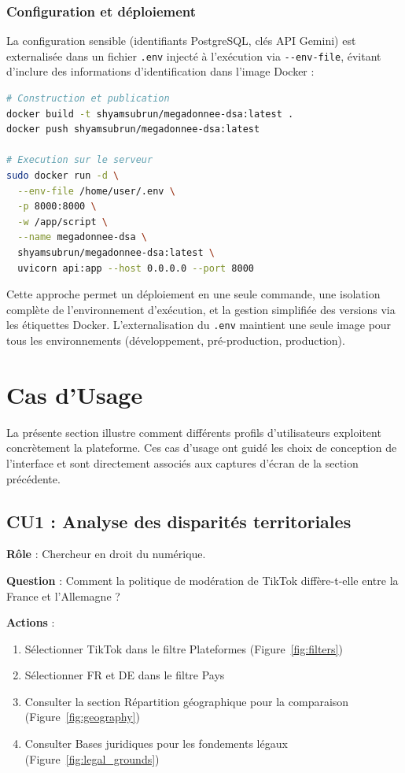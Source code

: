 \documentclass[10pt,twocolumn,a4paper]{article}
\begin{document}
\subsubsection{Configuration et déploiement}

La configuration sensible (identifiants PostgreSQL, clés API Gemini) est externalisée dans un fichier \texttt{.env} injecté à l'exécution via \texttt{-{}-env-file}, évitant d'inclure des informations d'identification dans l'image Docker :

\begin{lstlisting}[language=bash, caption={Déploiement du conteneur IA}]
# Construction et publication
docker build -t shyamsubrun/megadonnee-dsa:latest .
docker push shyamsubrun/megadonnee-dsa:latest

# Execution sur le serveur
sudo docker run -d \
  --env-file /home/user/.env \
  -p 8000:8000 \
  -w /app/script \
  --name megadonnee-dsa \
  shyamsubrun/megadonnee-dsa:latest \
  uvicorn api:app --host 0.0.0.0 --port 8000
\end{lstlisting}

Cette approche permet un déploiement en une seule commande, une isolation complète de l'environnement d'exécution, et la gestion simplifiée des versions via les étiquettes Docker. L'externalisation du \texttt{.env} maintient une seule image pour tous les environnements (développement, pré-production, production).


\section{Cas d'Usage}

La présente section illustre comment différents profils d'utilisateurs exploitent concrètement la plateforme. Ces cas d'usage ont guidé les choix de conception de l'interface et sont directement associés aux captures d'écran de la section précédente.

\subsection{CU1 : Analyse des disparités territoriales}

\textbf{Rôle} : Chercheur en droit du numérique.

\textbf{Question} : Comment la politique de modération de TikTok diffère-t-elle entre la France et l'Allemagne ?

\textbf{Actions} :
\begin{enumerate}
    \item Sélectionner TikTok dans le filtre Plateformes (Figure~\ref{fig:filters})
    \item Sélectionner FR et DE dans le filtre Pays
    \item Consulter la section Répartition géographique pour la comparaison (Figure~\ref{fig:geography})
    \item Consulter Bases juridiques pour les fondements légaux (Figure~\ref{fig:legal_grounds})
\end{enumerate}
\end{document}
